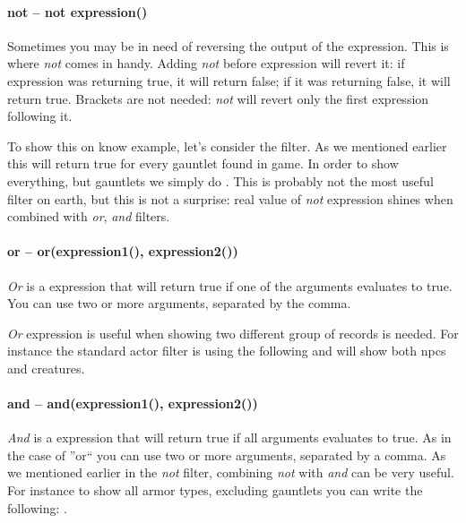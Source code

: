 \paragraph{not -- not expression()}
Sometimes you may be in need of reversing the output of the expression. This is where \textit{not} comes in handy. Adding \textit{not} before
expression will revert it: if expression was returning true, it will return false; if it was returning false, it will return true. Brackets
are not needed: \textit{not} will revert only the first expression following it.

To show this on know example, let's consider the  filter. As we mentioned earlier this will return true
for every gauntlet found in game. In order to show everything, but gauntlets we simply do .
This is probably not the most useful filter on earth, but this is not a surprise: real value of \textit{not} expression shines when combined with
\textit{or}, \textit{and} filters.

\paragraph{or -- or(expression1(), expression2())}
\textit{Or} is a expression that will return true if one of the arguments evaluates to true. You can use two or more arguments, separated by the comma.

\textit{Or} expression is useful when showing two different group of records is needed. For instance the standard actor filter is using the following
 and will show both npcs and creatures.

\paragraph{and -- and(expression1(), expression2())}
\textit{And} is a expression that will return true if all arguments evaluates to true. As in the case of ''or`` you can use two or more arguments,
separated by a comma.
As we mentioned earlier in the \textit{not} filter, combining \textit{not} with \textit{and} can be very useful. For instance to show all armor types,
excluding gauntlets you can write the following: .

